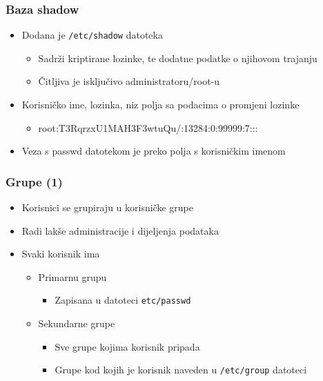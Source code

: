 \documentclass[table,usenames,dvipsnames] {beamer}
\newcommand{\shell}[1]{\texttt{#1}}
\begin{document}
\begin{frame}[t]
\frametitle{Baza shadow}
\begin{itemize}
  \item Dodana je \shell{/etc/shadow} datoteka
  \begin{itemize}
    \item Sadrži kriptirane lozinke, te dodatne podatke o njihovom trajanju
    \item Čitljiva je isključivo administratoru/root-u
  \end{itemize}
  \item Korisničko ime, lozinka, niz polja sa podacima o promjeni lozinke
  \begin{itemize}
    \item root:T3RqrzxU1MAH3F3wtuQu/:13284:0:99999:7:::
  \end{itemize}
  \item Veza s passwd datotekom je preko polja s korisničkim imenom
\end{itemize}
\end{frame}

\begin{frame}[t]
\frametitle{Grupe (1)}
\begin{itemize}
  \item Korisnici se grupiraju u korisničke grupe
  \item Radi lakše administracije i dijeljenja podataka
  \item Svaki korisnik ima
  \begin{itemize}
    \item Primarnu grupu
    \begin{itemize}
      \item Zapisana u datoteci \shell{etc/passwd} 
    \end{itemize}
    \item Sekundarne grupe
    \begin{itemize}
      \item  Sve grupe kojima korisnik pripada
      \item  Grupe kod kojih je korisnik naveden u \shell{/etc/group} 
                datoteci
    \end{itemize}
  \end{itemize}
\end{itemize}
\end{frame}
\end{document}
